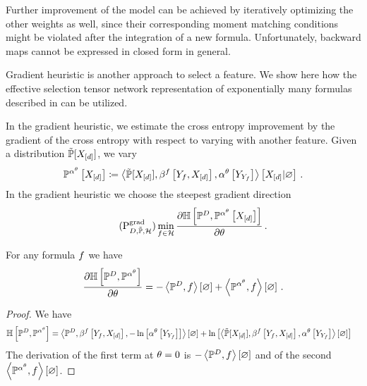 Further improvement of the model can be achieved by iteratively optimizing the other weights as well, since their corresponding moment matching conditions might be violated after the integration of a new formula.
Unfortunately, backward maps cannot be expressed in closed form in general.




Gradient heuristic is another approach to select a feature.
We show here how the effective selection tensor network representation of exponentially many formulas described in  can be utilized. %

In the gradient heuristic, we estimate the cross entropy improvement by the gradient of the cross entropy with respect to varying with another feature.
Given a distribution $\tilde{\mathbb{P}}[X_{[d]}]$, we vary %
\begin{align*}
    \mathbb{P}^{\alpha^\theta}\left[X_{[d]}\right]
    \coloneqq \left\langle \tilde{\mathbb{P}}[X_{[d]}],\beta^{f}\left[Y_{f},X_{[d]}\right],\alpha^\theta\left[Y_{Y_{f}}\right]\right\rangle \left[ X_{[d]} | \varnothing \right] \, .
\end{align*}
In the gradient heuristic we choose the steepest gradient direction
\begin{align}
    \label{prob:greedyGrad}\tag{$\probtagtypeinst{\gradientsymbol}{\datamap,\secprobtensor,\greedyhypothesis}$}
    \min_{\formula\in\greedyhypothesis} \difofwrt{\centropyof{\empdistribution}{\probofat{\softacttensor}{\shortcatvariables}}}{\canparam}   \, .
\end{align}

\begin{lemma}
    For any formula $f$ we have
    \begin{align*}
        \frac{\partial \mathbb{H}\left[\mathbb{P}^{D},\mathbb{P}^{\alpha^\theta}\right]}{\partial \theta} =
        -\left\langle \mathbb{P}^{D},f\right\rangle \left[ \varnothing \right] + \left\langle \mathbb{P}^{\alpha^\theta},f\right\rangle \left[ \varnothing \right] \, .
    \end{align*}
\end{lemma}
\begin{proof}
    We have
    \begin{align*}
        \mathbb{H}\left[\mathbb{P}^{D},\mathbb{P}^{\alpha^\theta}\right]
        & = \left\langle \mathbb{P}^{D},\beta^{f}\left[Y_{f},X_{[d]}\right],-\ln \left[ \alpha^\theta\left[Y_{Y_{f}}\right] \right]\right\rangle \left[ \varnothing \right]
        + \ln \left[ \left\langle \tilde{\mathbb{P}}[X_{[d]}],\beta^{f}\left[Y_{f},X_{[d]}\right],\alpha^\theta\left[Y_{Y_{f}}\right]\right\rangle \left[ \varnothing \right] \right]
    \end{align*}
    The derivation of the first term at $\theta=0$ is $-\left\langle \mathbb{P}^{D},f\right\rangle \left[ \varnothing \right]$ and of the second $\left\langle \mathbb{P}^{\alpha^\theta},f\right\rangle \left[ \varnothing \right]$.
\end{proof}

